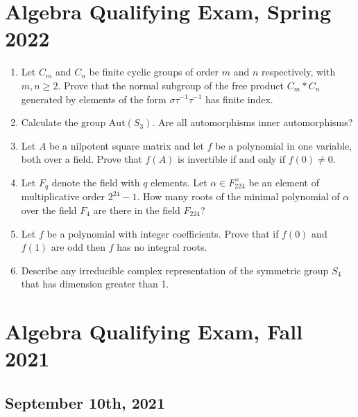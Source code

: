 \documentclass{article}
\begin{document}
\section*{Algebra Qualifying Exam, Spring 2022}
\begin{enumerate}
    \item Let \(C_m\) and \(C_n\) be finite cyclic groups of order \(m\) and \(n\) respectively, with \(m, n \geq 2\). Prove that the normal subgroup of the free product \(C_m * C_n\) generated by elements of the form \(\sigma \tau^{-1} \tau^{-1}\) has finite index.

    \item Calculate the group \(\text{Aut}(S_3)\). Are all automorphisms inner automorphisms?

    \item Let \(A\) be a nilpotent square matrix and let \(f\) be a polynomial in one variable, both over a field. Prove that \(f(A)\) is invertible if and only if \(f(0) \neq 0\).

    \item Let \(F_q\) denote the field with \(q\) elements. Let \(\alpha \in F_{224}^\times\) be an element of multiplicative order \(2^{24} - 1\). How many roots of the minimal polynomial of \(\alpha\) over the field \(F_4\) are there in the field \(F_{224}\)?

    \item Let \(f\) be a polynomial with integer coefficients. Prove that if \(f(0)\) and \(f(1)\) are odd then \(f\) has no integral roots.

    \item Describe any irreducible complex representation of the symmetric group \(S_4\) that has dimension greater than 1.
\end{enumerate}

\section*{Algebra Qualifying Exam, Fall 2021}
\subsection*{September 10th, 2021}
\end{document}
